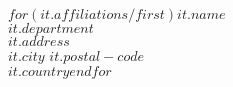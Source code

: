 $for(it.affiliations/first)$$it.name$\\$it.department$\\$it.address$\\$it.city$ $it.postal-code$\\$it.country$$endfor$
